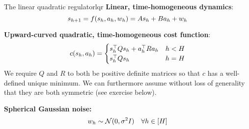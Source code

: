 \documentclass[\main/main]{subfiles}
\begin{document}
\begin{definition}{The linear quadratic regulator}{lqr}
    \textbf{Linear, time-homogeneous dynamics}: \[
        s_{h+1} = f(s_h, a_h, w_h) = A s_h + B a_h + w_h
    \]

    \noindent \textbf{Upward-curved quadratic, time-homogeneous cost function}:
    \[
        c(s_h, a_h) = \begin{cases}
            s_h^\top Q s_h + a_h^\top R a_h & h < H \\
            s_h^\top Q s_h                            & h = H
        \end{cases}
    \]
    We require $Q$ and $R$ to both be positive definite matrices so that $c$ has a well-defined unique minimum. We can furthermore assume without loss of generality that they are both symmetric (see exercise below).



    \noindent \textbf{Spherical Gaussian noise:} \[ w_h \sim \mathcal{N}(0, \sigma^2 I) \quad \forall h \in [H] \]


\end{definition}
\end{document}
